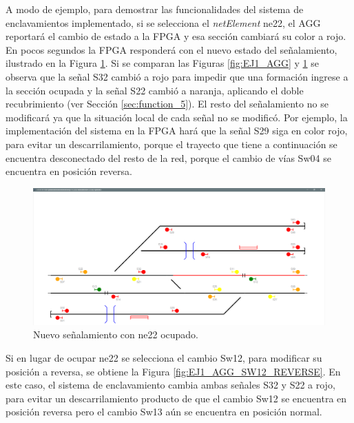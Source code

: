 	A modo de ejemplo, para demostrar las funcionalidades del sistema de enclavamientos implementado, si se selecciona el \textit{netElement} ne22, el AGG reportará el cambio de estado a la FPGA y esa sección cambiará su color a rojo. En pocos segundos la FPGA responderá con el nuevo estado del señalamiento, ilustrado en la Figura \ref{fig:EJ1_AGG_S32_OCCUPIED}. Si se comparan las Figuras \ref{fig:EJ1_AGG} y \ref{fig:EJ1_AGG_S32_OCCUPIED} se observa que la señal S32 cambió a rojo para impedir que una formación ingrese a la sección ocupada y la señal S22 cambió a naranja, aplicando el doble recubrimiento (ver Sección \ref{sec:function_5}). El resto del señalamiento no se modificará ya que la situación local de cada señal no se modificó. Por ejemplo, la implementación del sistema en la FPGA hará que la señal S29 siga en color rojo, para evitar un descarrilamiento, porque el trayecto que tiene a continuación se encuentra desconectado del resto de la red, porque el cambio de vías Sw04 se encuentra en posición reversa.
	
	\begin{figure}[H]
		\centering
		\includegraphics[origin = c, width=1\textwidth]{resultados-obtenidos/ejemplo1/images/AGG_S32_OCCUPIED}
		\centering\caption{Nuevo señalamiento con ne22 ocupado.}
		\label{fig:EJ1_AGG_S32_OCCUPIED}
	\end{figure}

	Si en lugar de ocupar ne22 se selecciona el cambio Sw12, para modificar su posición a reversa, se obtiene la Figura \ref{fig:EJ1_AGG_SW12_REVERSE}. En este caso, el sistema de enclavamiento cambia ambas señales S32 y S22 a rojo, para evitar un descarrilamiento producto de que el cambio Sw12 se encuentra en posición reversa pero el cambio Sw13 aún se encuentra en posición normal.		
	
